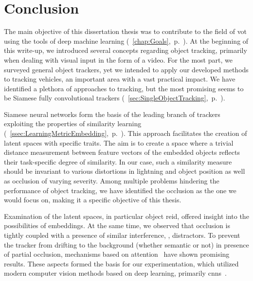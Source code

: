 \chapter{Conclusion}
\label{chap:Conclusion}

The main objective of this dissertation thesis was to contribute to the field of \gls{vot} using the tools of deep machine learning (\chaptertext{}~\ref{chap:Goals},~p.~\pageref{chap:Goals}). At the beginning of this write-up, we introduced several concepts regarding object tracking, primarily when dealing with visual input in the form of a video. For the most part, we surveyed general object trackers, yet we intended to apply our developed methods to tracking vehicles, an important area with a vast practical impact. We have identified a plethora of approaches to tracking, but the most promising seems to be Siamese fully convolutional trackers (\sectiontext{}~\ref{sec:SingleObjectTracking},~p.~\pageref{sec:SingleObjectTracking}).

Siamese neural networks form the basis of the leading branch of trackers exploiting the properties of similarity learning (\sectiontext{}~\ref{ssec:LearningMetricEmbedding},~p.~\pageref{ssec:LearningMetricEmbedding}). This approach facilitates the creation of latent spaces with specific traits. The aim is to create a space where a trivial distance measurement between feature vectors of the embedded objects reflects their task-specific degree of similarity. In our case, such a similarity measure should be invariant to various distortions in lightning and object position as well as occlusion of varying severity. Among multiple problems hindering the performance of object tracking, we have identified the occlusion as the one we would focus on, making it a specific objective of this thesis.

Examination of the latent spaces, in particular object \gls{reid}, offered insight into the possibilities of embeddings. At the same time, we observed that occlusion is tightly coupled with a presence of similar interference, \ietext{}, distractors. To prevent the tracker from drifting to the background (whether semantic or not) in presence of partial occlusion, mechanisms based on attention~\cite{vaswani2017attention} have shown promising results. These aspects formed the basis for our experimentation, which utilized modern computer vision methods based on deep learning, primarily \glspl{cnn}~\cite{krizhevsky2012classification}.

